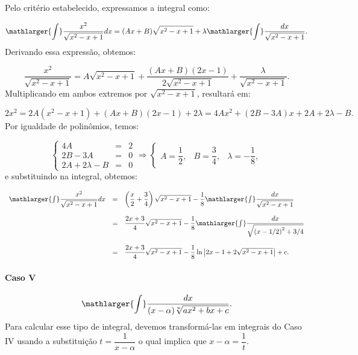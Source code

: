 \cleardoublepage\documentclass[../main.tex]{subfiles}
\begin{document}
\begin{solution}
Pelo critério estabelecido, expressamos a integral como:

\[ \mathlarger{\int} \dfrac{x^2}{\sqrt{x^2-x+1}}dx = (Ax+B)\sqrt{x^2-x+1} + \lambda \mathlarger{\int} \dfrac{dx}{\sqrt{x^2-x+1}}. \]
Derivando essa expressão, obtemos:

\[ \dfrac{x^2}{\sqrt{x^2-x+1}} = A\sqrt{x^2-x+1}+ \dfrac{(Ax+B)(2x-1)}{2\sqrt{x^2-x+1}} +\dfrac{ \lambda }{\sqrt{x^2-x+1}}. \]
Multiplicando em ambos extremos por \( \sqrt{x^2-x+1}\), resultará em:

\[ 2x^2 = 2A(x^2-x+1)+(Ax+B)(2x-1) +2\lambda= 4Ax^2 +(2B-3A)x +2A+2\lambda -B . \]
Por igualdade de polinômios, temos:

\[ \left\{ \begin{array}{rcr} 4A &=&2\\ 2B-3A &=&0\\ 2A+2\lambda -B&=&0 \end{array} \right. \Rightarrow \left\{ \begin{array}{ccc} A=\dfrac{1}{2},&B=\dfrac{3}{4},&\lambda=-\dfrac{1}{8}, \end{array} \right. \]
e substituindo na integral, obtemos:

\[ \begin{array}{rcl} \mathlarger{\int} \dfrac{x^2}{\sqrt{x^2-x+1}}dx &=& \left(\dfrac{x}{2}+\dfrac{3}{4}\right)\sqrt{x^2-x+1} -\dfrac{1}{8} \mathlarger{\int} \dfrac{dx}{\sqrt{x^2-x+1}}\\ \\ &=& \dfrac{2x+3}{4}\sqrt{x^2-x+1} -\dfrac{1}{8} \mathlarger{\int} \dfrac{dx}{\sqrt{\left(x-1/2\right)^2 +3/4}}\\ \\ &=& \dfrac{2x+3}{4}\sqrt{x^2-x+1} -\dfrac{1}{8} \ln \left|2x-1+2\sqrt{x^2-x+1}\right|+c.\\ \end{array} \]
\end{solution}

\paragraph*{Caso V}
\[ \mathlarger{\int} \dfrac{dx}{(x-\alpha)\sqrt[n]{ax^2+bx+c}}. \]
Para calcular esse tipo de integral, devemos transformá-las em integrais do Caso IV usando a substituição \(t=\dfrac{1}{x-\alpha}\) o qual implica que \(x-\alpha=\dfrac{1}{t}\).
\end{document}
